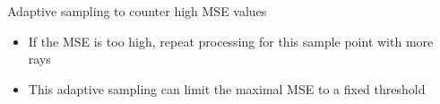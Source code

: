 \begin{frame}[t]{Adaptive sampling to counter high MSE values}
      \begin{itemize}
        \item If the MSE is too high, repeat processing for this sample point with more rays
        \item This adaptive sampling can limit the maximal MSE to a fixed threshold
      \end{itemize}
\end{frame}
